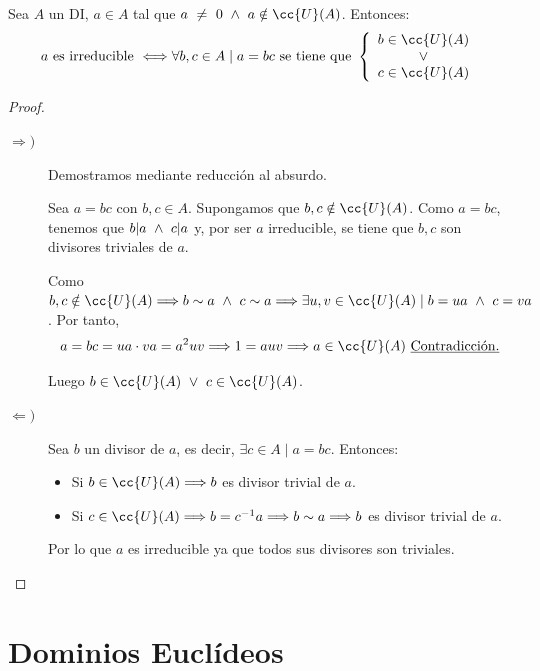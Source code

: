 \begin{prop}
    Sea $A$ un DI, $a \in A$ tal que $a~\neq~0 \y a \notin \cc{U}(A)$. Entonces:
    $$a \text{ es irreducible } \Longleftrightarrow \forall b,c \in A \mid a=bc \text{ se tiene que }
    \left\{\begin{array}{c}
        b \in \cc{U}(A) \\ \o \\ c \in \cc{U}(A)
    \end{array}\right.$$
\end{prop}
\begin{proof}\
\begin{description}
    \item[$\Longrightarrow)$]Demostramos mediante reducción al absurdo.
    
    Sea $a=bc$ con $b,c \in A$. Supongamos que $b,c \notin \cc{U}(A)$. Como $a=bc$, tenemos que $b|a \ \land \  c|a$ y, por ser $a$ irreducible, se tiene que $b,c$ son divisores triviales de $a$.
    
    Como $b,c \notin \cc{U}(A) \Longrightarrow b \sim a \y c \sim a \Longrightarrow \exists u,v \in \cc{U}(A) \mid b=ua \y c=va$. Por tanto,
    $$a=bc = ua \cdot va = a^2 uv \Longrightarrow 1=auv \Longrightarrow a \in \cc{U}(A) \text{ \underline{Contradicción.}}$$
    
    Luego $b \in \cc{U}(A) \o c \in \cc{U}(A)$.
    
    \item[$\Longleftarrow)$] Sea $b$ un divisor de $a$, es decir, $\exists c\in A\mid a=bc$. Entonces:
    \begin{itemize}
        \item Si $b \in \cc{U}(A) \Longrightarrow b$ es divisor trivial de $a$.
        \item Si $c \in \cc{U}(A) \Longrightarrow b=c^{-1}a \Longrightarrow b\sim a \Longrightarrow b$ es divisor trivial de $a$.
    \end{itemize}
    
    Por lo que $a$ es irreducible ya que todos sus divisores son triviales.
\end{description}
\end{proof}

\section{Dominios Euclídeos}

